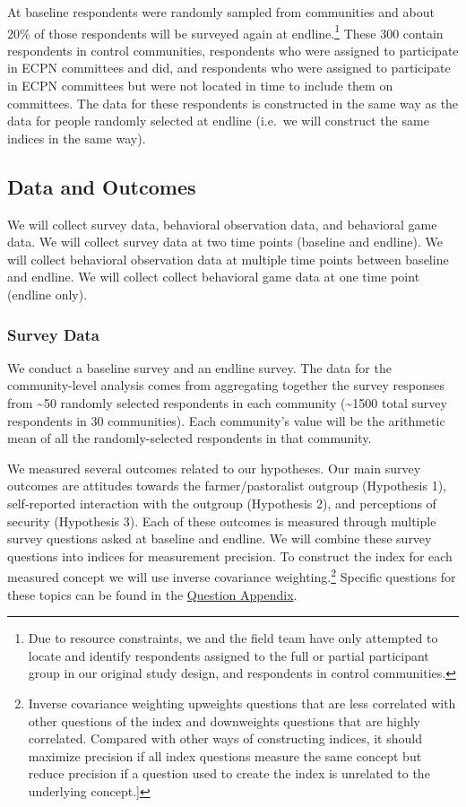 \documentclass[
]{article}
\begin{document}
At baseline respondents were randomly sampled from communities and about
20\% of those respondents will be surveyed again at endline.\footnote{Due
  to resource constraints, we and the field team have only attempted to
  locate and identify respondents assigned to the full or partial
  participant group in our original study design, and respondents in
  control communities.} These 300 contain respondents in control
communities, respondents who were assigned to participate in ECPN
committees and did, and respondents who were assigned to participate in
ECPN committees but were not located in time to include them on
committees. The data for these respondents is constructed in the same
way as the data for people randomly selected at endline (i.e.~we will
construct the same indices in the same way).

\hypertarget{data-and-outcomes}{%
\subsection{Data and Outcomes}\label{data-and-outcomes}}

We will collect survey data, behavioral observation data, and behavioral
game data. We will collect survey data at two time points (baseline and
endline). We will collect behavioral observation data at multiple time
points between baseline and endline. We will collect collect behavioral
game data at one time point (endline only).

\hypertarget{survey-data}{%
\subsubsection{Survey Data}\label{survey-data}}

We conduct a baseline survey and an endline survey. The data for the
community-level analysis comes from aggregating together the survey
responses from \textasciitilde50 randomly selected respondents in each
community (\textasciitilde1500 total survey respondents in 30
communities). Each community's value will be the arithmetic mean of all
the randomly-selected respondents in that community.

We measured several outcomes related to our hypotheses. Our main survey
outcomes are attitudes towards the farmer/pastoralist outgroup
(Hypothesis 1), self-reported interaction with the outgroup (Hypothesis
2), and perceptions of security (Hypothesis 3). Each of these outcomes
is measured through multiple survey questions asked at baseline and
endline. We will combine these survey questions into indices for
measurement precision. To construct the index for each measured concept
we will use inverse covariance weighting.\footnote{Inverse covariance
  weighting upweights questions that are less correlated with other
  questions of the index and downweights questions that are highly
  correlated. Compared with other ways of constructing indices, it
  should maximize precision if all index questions measure the same
  concept but reduce precision if a question used to create the index is
  unrelated to the underlying concept.{]}} Specific questions for these
topics can be found in the \protect\hyperlink{questions}{Question
Appendix}.
\end{document}

